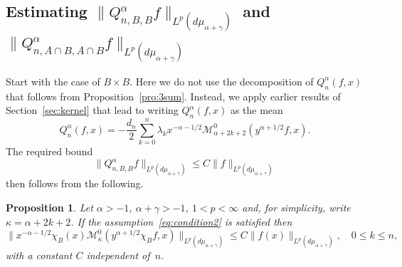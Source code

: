 \documentclass[a4paper]{amsart}
\newcommand{\calM}{\mathcal{M}}
\newcommand{\muag}{d\mu_{\alpha+\gamma}}
\newtheorem{propo}{Proposition}
\begin{document}
\subsection{Estimating $\|Q^\alpha_{n,B,B}f\|_{L^p(\muag)}$
and $\|Q^\alpha_{n,A\cap B, A\cap B}f\|_{L^p(\muag)}$}

Start with the case of $B\times B$. Here we do not use the
decomposition of $Q_n^\alpha(f,x)$ that follows from
Proposition~\ref{pro:3sum}. Instead, we apply
earlier results of Section~\ref{sec:kernel} that lead
to writing $Q_n^\alpha(f,x)$ as the mean
\begin{equation*}
  Q_n^\alpha(f,x) = -\frac{d_n}{2} \sum_{k=0}^n
  \lambda_k x^{-\alpha-1/2}\calM_{\alpha+2k+2}^0(y^{\alpha+1/2}f,x).
\end{equation*}
The required bound
\begin{equation*}
  \|Q^\alpha_{n,B,B}f\|_{L^p(\muag)} \le C\|f\|_{L^p(\muag)}
\end{equation*}
then follows from the following.

\begin{propo}
\label{pro:BB}
Let $\alpha>-1$, $\alpha+\gamma>-1$, $1<p<\infty$ and,
for simplicity, write $\kappa=\alpha+2k+2$.
If the assumption~\eqref{eq:condition2} is satisfied then
\begin{equation*}
  \| x^{-\alpha-1/2}\chi_{B}(x)
    \calM_{\kappa}^0(y^{\alpha+1/2}\chi_{B}f,x) \|_{L^p(\muag)}
  \le C \| f(x) \|_{L^p(\muag)},
  \quad 0 \le k \le n,
\end{equation*}
with a constant $C$ independent of~$n$.
\end{propo}
\end{document}
